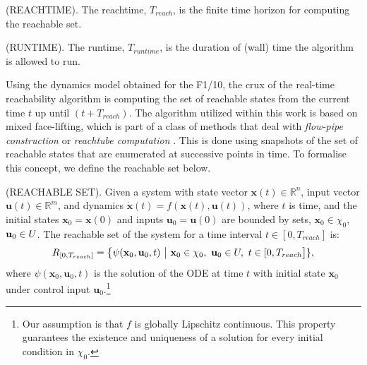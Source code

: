 \documentclass[manuscript,screen,review]{acmart}
\newcommand{\todo}[1]{\textcolor{red}{\textbf{\underline{TODO:}} #1}}
\begin{document}
\begin{definition}%
(REACHTIME). The reachtime, $T_{reach}$, is the finite time horizon for computing the reachable set.
\end{definition}%
\begin{definition}%
(RUNTIME). The runtime, $T_{runtime}$, is the duration of (wall) time the algorithm is allowed to run.
\end{definition}%
 Using the dynamics model obtained for the F1/10, the crux of the real-time reachability algorithm is computing the set of reachable states from the current time $t$ up until $(t+T_{reach})$. The algorithm utilized within this work is based on mixed face-lifting, which is part of a class of methods that deal with \textit{flow-pipe construction} or \textit{reachtube computation} \cite{Johnson2016}. This is done using snapshots of the set of reachable states that are enumerated at successive points in time. To formalise this concept, we define the reachable set below.
\smallskip
\begin{definition}%
(REACHABLE SET). Given a system with state vector $\textbf{x}(t) \in \mathbb{R}^n$, input vector $\textbf{u}(t) \in \mathbb{R}^m$, and dynamics $\dot{\textbf{x}}(t)=f(\textbf{x}(t),\textbf{u}(t))$, where $t$ is time, and the initial states $\textbf{x}_0 = \textbf{x}(0)$ and inputs $\textbf{u}_0 = \textbf{u}(0)$ are bounded by sets, $\textbf{x}_0 \in \chi_0$, $\textbf{u}_0 \in \mathnormal{U}$. The reachable set of the system for a time interval $ t \in [0,T_{reach}]$ is:%
%
\begin{equation*}%
    \mathnormal{R}_{[0,T_{reach}]} = \big \{ \psi(\textbf{x}_0,\textbf{u}_0,t) \ \big| \ \textbf{x}_0 \in \chi_0, \ \textbf{u}_0 \in \mathnormal{U}, \ t \in [0,T_{reach}\big]\},%
\end{equation*}%
%
\noindent where $\psi(\textbf{x}_0,\textbf{u}_0,t)$ is the solution of the ODE at time $t$ with initial state $\textbf{x}_0$ under control input $\textbf{u}_0$.\footnote{Our assumption is that $f$ is globally Lipschitz continuous. This property guarantees the existence and uniqueness of a solution for every initial condition in $\chi_0$.}
\end{definition}%
\smallskip
\end{document}
